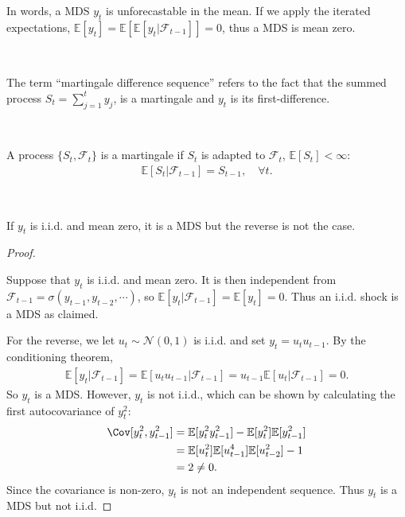 In words, a MDS $y_t$ is unforecastable in the mean. If we apply the iterated expectations, $\mathbb{E}[y_t] = \mathbb{E}\left[ \mathbb{E}[y_t | \mathcal{F}_{t-1}] \right] = 0$,
thus a MDS is mean zero.

\begin{note}
   \
   
   The term ``martingale difference sequence'' refers to the fact that the summed process $S_t = \sum_{j=1}^{t} y_j $, is a martingale and $y_t$ is its first-difference. 
   \begin{definition}[Martingale]\label{def:martingale}
       \

       A process $\{S_t, \mathcal{F}_t\}$ is a martingale if $S_t$ is adapted to $\mathcal{F}_t$, $\mathbb{E}[S_t] < \infty$:
       \begin{gather*}
           \mathbb{E}[S_t | \mathcal{F}_{t-1}] = S_{t-1}, \quad \forall t.
       \end{gather*}
   \end{definition}
\end{note}

\begin{proposition}\label{prop:mds-property-1}
    \

    If $y_t$ is i.i.d. and mean zero, it is a MDS but the reverse is not the case. 
\end{proposition}
\begin{proof}
    \

    Suppose that $y_t$ is i.i.d. and mean zero. It is then independent from $\mathcal{F}_{t-1} = \sigma(y_{t-1}, y_{t-2}, \cdots)$,
    so $\mathbb{E}[y_t | \mathcal{F}_{t-1}] = \mathbb{E}[y_t] = 0$.
    Thus an i.i.d. shock is a MDS as claimed.

    For the reverse, we let $u_t \sim \mathcal{N} (0,1)$ is i.i.d. and set $y_t = u_t u_{t-1}.$
    By the conditioning theorem,
    \begin{gather*}
        \mathbb{E}[y_t | \mathcal{F}_{t-1}] = \mathbb{E}[u_t u_{t-1} | \mathcal{F}_{t-1}] = u_{t-1} \mathbb{E}[u_t | \mathcal{F}_{t-1}] = 0.
    \end{gather*}
    So $y_t$ is a MDS. However, $y_t$ is not i.i.d., which can be shown by calculating the first autocovariance of $y_t^2$:
    \begin{align*}
        \Cov[y_t^2, y_{t-1}^2] &= \mathbb{E}[y_t^2 y_{t-1}^2] - \mathbb{E}[y_t^2] \mathbb{E}[y_{t-1}^2] \\
        &= \mathbb{E}[u_t^2]\mathbb{E}[u_{t-1}^4]\mathbb{E}[u_{t-2}^2] - 1 \\
        &= 2 \neq 0.
    \end{align*}
    Since the covariance is non-zero, $y_t$ is not an independent sequence.
    Thus $y_t$ is a MDS but not i.i.d.
\end{proof}

